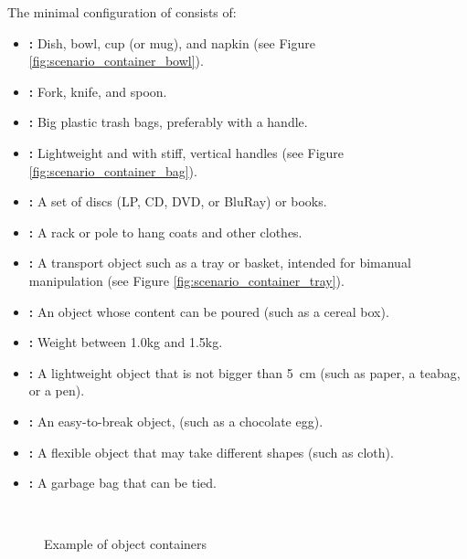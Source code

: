 The minimal configuration of \KnownObjects{} consists of:
\begin{itemize}
	\item \textbf{:} Dish, bowl, cup (or mug), and napkin (see Figure \ref{fig:scenario_container_bowl}).
	\item \textbf{:} Fork, knife, and spoon.
	\item \textbf{:} Big plastic trash bags, preferably with a handle.
	\item \textbf{:} Lightweight and with stiff, vertical handles (see Figure \ref{fig:scenario_container_bag}).
	\item \textbf{:} A set of discs (LP, CD, DVD, or BluRay) or books.
	\item \textbf{:} A rack or pole to hang coats and other clothes.
	\item \textbf{:} A transport object such as a tray or basket, intended for bimanual manipulation (see Figure \ref{fig:scenario_container_tray}).
	\item \textbf{:} An object whose content can be poured (such as a cereal box).
	\item \textbf{:} Weight between 1.0kg and 1.5kg.
	\item \textbf{:} A lightweight object that is not bigger than \SI{5}{\centi\meter} (such as paper, a teabag, or a pen).
	\item \textbf{:} An easy-to-break object, (such as a chocolate egg).
	\item \textbf{:} A flexible object that may take different shapes (such as cloth).
	\item \textbf{:} A garbage bag that can be tied.
\end{itemize}

\begin{figure}[H]
	\centering
	~
	~
	\caption{Example of object containers}
	\label{fig:scenario_containers}
\end{figure}

